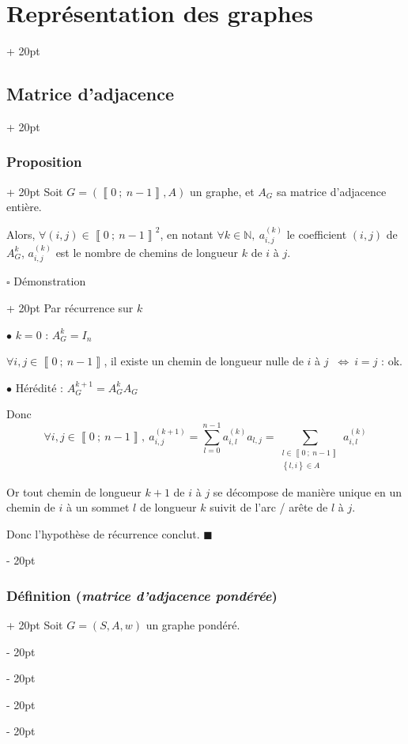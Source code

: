 \documentclass[a4paper, 12pt, twoside]{article}
\newcommand{\N}{\mathbb{N}} %
\newcommand{\nset}[2]{\left\llbracket #1\ ;\ #2 \right\rrbracket}
\newcommand{\set}[1]{\left\{ #1 \right\}}
\newcommand{\ssi}{\ \Leftrightarrow \ }
\newcommand{\ind}[1][20pt]{\advance\leftskip + #1}
\newcommand{\deind}[1][20pt]{\advance\leftskip - #1}
\newenvironment{indt}[2][20pt]{#2 \par \ind[#1]}{\par \deind} %
\begin{document}
\begin{indt}{\section{Représentation des graphes}}
\begin{indt}{\subsection{Matrice d'adjacence}}
            \vspace{12pt}
            
            \begin{indt}{\subsubsection{Proposition}}
                Soit $G = (\nset{0}{n - 1}, A)$ un graphe, et $A_G$ sa matrice d'adjacence entière.

                Alors, $\forall (i, j) \in \nset{0}{n - 1}^2$, en notant $\forall k \in \N,\ a_{i, j}^{(k)}$ le coefficient $(i, j)$ de $A_G^k$, $a_{i, j}^{(k)}$ est le nombre de chemins de longueur $k$ de $i$ à $j$.
                
                \vspace{12pt}

                \begin{indt}{$\square$ Démonstration}
                    Par récurrence sur $k$

                    $\bullet$ $k = 0$ : $A_G^k = I_n$

                    $\forall i, j \in \nset{0}{n - 1}$, il existe un chemin de longueur nulle de $i$ à $j$ $\ssi i = j$ : ok.
                    
                    \vspace{6pt}

                    $\bullet$ Hérédité : $A_G^{k + 1} = A_G^k A_G$

                    Donc
                    \[
                        \forall i, j \in \nset 0 {n - 1},\ a_{i,j}^{(k + 1)}
                        = \sum_{l = 0}^{n - 1} a_{i,l}^{(k)} a_{l,j}
                        = \sum_{\substack{l \in \nset0 {n - 1} \\ \set{l, i} \in A}} a_{i,l}^{(k)}
                    \]

                    Or tout chemin de longueur $k + 1$ de $i$ à $j$ se décompose de manière unique en un chemin de $i$ à un sommet $l$ de longueur $k$ suivit  de l'arc / arête de $l$ à $j$.

                    Donc l'hypothèse de récurrence conclut. $\blacksquare$
                \end{indt}

                \vspace{12pt}
                
                \begin{indt}{\subsubsection{Définition (\textit{matrice d'adjacence pondérée})}}
                    Soit $G = (S, A, w)$ un graphe pondéré.


\end{indt}
\end{indt}
\end{indt}
\end{indt}
\end{document}
